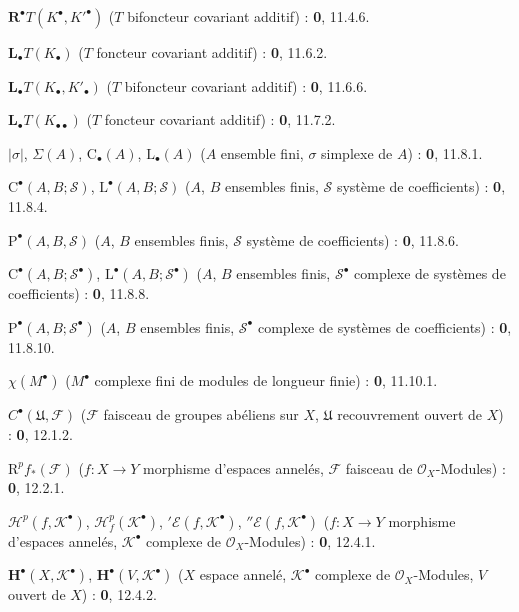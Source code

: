 \begin{flushleft}
$\mathbf R^\bullet T(K^\bullet,K'^{\bullet})$ ($T$ bifoncteur covariant
additif) : \textbf{0}, 11.4.6.

$\mathbf L_\bullet T(K_\bullet)$ ($T$ foncteur covariant additif) : \textbf{0}, 11.6.2.

$\mathbf L_\bullet T(K_\bullet,K'_\bullet)$ ($T$ bifoncteur covariant
additif) : \textbf{0}, 11.6.6.

$\mathbf L_\bullet T(K_{\bullet\bullet})$ ($T$ foncteur covariant additif) :
\textbf{0}, 11.7.2.

$|\sigma|$, $\Sigma(A)$, $\mathrm C_\bullet(A)$, $\mathrm L_\bullet(A)$ ($A$ ensemble fini,
$\sigma$ simplexe de $A$) : \textbf{0}, 11.8.1.

$\mathrm C^\bullet(A,B;\mathscr S)$, $\mathrm L^\bullet(A,B;\mathscr S)$ ($A$, $B$ ensembles
finis, $\mathscr S$ système de coefficients) : \textbf{0}, 11.8.4.

$\mathrm P^\bullet(A,B,\mathscr S)$ ($A$, $B$ ensembles finis, $\mathscr S$ système
de coefficients) : \textbf{0}, 11.8.6.

$\mathrm C^\bullet(A,B;\mathscr S^\bullet)$,
$\mathrm L^\bullet(A,B;\mathscr S^\bullet)$ ($A$, $B$ ensembles finis,
$\mathscr S^\bullet$ complexe de systèmes de coefficients) : \textbf{0}, 11.8.8.

$\mathrm P^\bullet(A,B;\mathscr S^\bullet)$ ($A$, $B$ ensembles finis,
$\mathscr S^\bullet$ complexe de systèmes de coefficients) : \textbf{0}, 11.8.10.

$\chi(M^\bullet)$ ($M^\bullet$ complexe fini de modules de longueur finie) :
\textbf{0}, 11.10.1.

$C^\bullet(\mathfrak U,\mathcal F)$ ($\mathcal F$ faisceau de groupes abéliens
sur $X$, $\mathfrak U$ recouvrement ouvert de $X$) : \textbf{0}, 12.1.2.

$\mathrm R^pf_*(\mathcal F)$ ($f:X\to Y$ morphisme d'espaces annelés,
$\mathcal F$ faisceau de $\mathcal O_X$-Modules) : \textbf{0}, 12.2.1.

$\mathscr H^p(f,\mathcal K^\bullet)$,
$\mathscr H_f^p(\mathcal K^\bullet)$, ${}'\mathcal E(f,\mathcal K^\bullet)$,
${}''\mathcal E(f,\mathcal K^\bullet)$ ($f:X\to Y$ morphisme d'espaces
annelés, $\mathcal K^\bullet$ complexe de $\mathcal O_X$-Modules) : \textbf{0}, 12.4.1.

$\mathbf H^\bullet(X,\mathcal K^\bullet)$,
$\mathbf H^\bullet(V,\mathcal K^\bullet)$ ($X$ espace annelé,
$\mathcal K^\bullet$ complexe de $\mathcal O_X$-Modules, $V$ ouvert de $X$) :
\textbf{0}, 12.4.2.


\end{flushleft}

